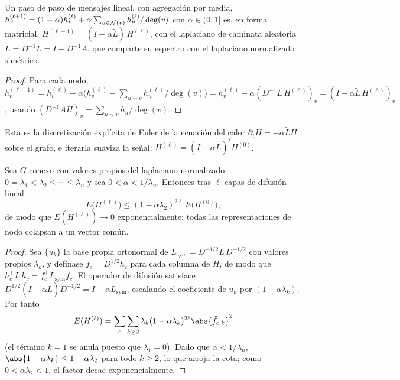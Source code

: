 \begin{proposition}
\label{prop:graphs:diffusion}
Un paso de paso de mensajes lineal, con agregaci\'on por media,
$h_v^{(\ell+1)} = (1-\alpha) h_v^{(\ell)} + \alpha \sum_{u \in \mathcal{N}(v)}
h_u^{(\ell)}/\deg(v)$ con $\alpha \in (0,1]$ es, en forma matricial,
$H^{(\ell+1)} = (I - \alpha \tilde L)\, H^{(\ell)}$, con el laplaciano de
caminata aleatoria $\tilde L = D^{-1} L = I - D^{-1} A$, que comparte su espectro
con el laplaciano normalizado sim\'etrico.
\end{proposition}

\begin{proof}
Para cada nodo,
$h_v^{(\ell+1)} = h_v^{(\ell)} - \alpha\big(h_v^{(\ell)}
- \sum_{u \sim v} h_u^{(\ell)}/\deg(v)\big)
= h_v^{(\ell)} - \alpha (D^{-1} L\, H^{(\ell)})_v
= (I - \alpha\tilde L\, H^{(\ell)})_v$, usando
$(D^{-1} A H)_v = \sum_{u \sim v} h_u/\deg(v)$.
\end{proof}

Esta es la discretizaci\'on expl\'icita de Euler de la ecuaci\'on del calor
$\partial_t H = -\alpha \tilde L H$ sobre el grafo, e iterarla suaviza la se\~nal:
$H^{(\ell)} = (I - \alpha\tilde L)^\ell H^{(0)}$.

\begin{theorem}
\label{thm:graphs:oversmoothing}
Sea $G$ conexo con valores propios del laplaciano normalizado
$0 = \lambda_1 < \lambda_2 \le \cdots \le \lambda_n$ y sea
$0 < \alpha < 1/\lambda_n$. Entonces tras $\ell$ capas de difusi\'on lineal
\[
  E\big(H^{(\ell)}\big) \le (1 - \alpha \lambda_2)^{2\ell}\, E\big(H^{(0)}\big),
\]
de modo que $E(H^{(\ell)}) \to 0$ exponencialmente: todas las representaciones de
nodo colapsan a un vector com\'un.
\end{theorem}

\begin{proof}
Sea $\{u_k\}$ la base propia ortonormal de
$L_{\mathrm{sym}} = D^{-1/2} L\, D^{-1/2}$ con valores propios $\lambda_k$, y
def\'inase $f_c = D^{1/2} h_c$ para cada columna de $H$, de modo que
$h_c^\top L\, h_c = f_c^\top L_{\mathrm{sym}} f_c$. El operador de difusi\'on
satisface $D^{1/2}(I - \alpha\tilde L)D^{-1/2} = I - \alpha L_{\mathrm{sym}}$,
escalando el coeficiente de $u_k$ por $(1 - \alpha\lambda_k)$. Por tanto
\[
  E(H^{(\ell)}) = \sum_c \sum_{k \ge 2}
    \lambda_k (1-\alpha\lambda_k)^{2\ell} \abs{\hat f_{c,k}}^2
\]
(el t\'ermino $k=1$ se anula puesto que $\lambda_1 = 0$). Dado que
$\alpha < 1/\lambda_n$, $\abs{1-\alpha\lambda_k} \le 1 - \alpha\lambda_2$ para
todo $k \ge 2$, lo que arroja la cota; como $0 < \alpha\lambda_2 < 1$, el factor
decae exponencialmente.
\end{proof}

